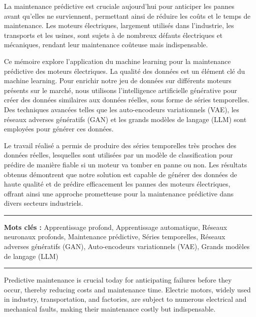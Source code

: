 
La maintenance prédictive est cruciale aujourd'hui pour anticiper les pannes avant qu'elles ne surviennent, 
permettant ainsi de réduire les coûts et le temps de maintenance. Les moteurs électriques, largement utilisés dans l'industrie, 
les transports et les usines, 
sont sujets à de nombreux défauts électriques et mécaniques, rendant leur maintenance coûteuse mais indispensable.

\medskip

Ce mémoire explore l'application du machine learning pour la maintenance prédictive des moteurs électriques. 
La qualité des données est un élément clé du machine learning. Pour enrichir notre jeu de données sur différents moteurs 
présents sur le marché, nous utilisons l'intelligence artificielle générative pour créer des données similaires aux données réelles,
 sous forme de séries temporelles. Des techniques avancées telles que les auto-encodeurs variationnels (VAE), 
 les réseaux adverses génératifs (GAN) et les grands modèles de langage (LLM) sont employées pour générer ces données.

\medskip
Le travail réalisé a permis de produire des séries temporelles très proches des données réelles,
lesquelles sont utilisées par un modèle de classification pour prédire de manière fiable si un moteur va tomber en panne ou non. 
Les résultats obtenus démontrent que notre solution est capable de générer des données de haute qualité et de prédire efficacement 
les pannes des moteurs électriques, offrant ainsi une approche prometteuse pour la maintenance prédictive dans divers secteurs industriels.

\vspace{1cm}


\noindent\rule[2pt]{\textwidth}{0.5pt}

{\textbf{Mots clés :}}
Apprentissage profond, Apprentissage automatique, Réseaux neuronaux profonds, Maintenance prédictive, 
Séries temporelles, Réseaux adverses génératifs (GAN), Auto-encodeurs variationnels (VAE), Grands modèles de langage (LLM)
\\
\noindent\rule[2pt]{\textwidth}{0.5pt}

\clearpage


Predictive maintenance is crucial today for anticipating failures before they occur, 
thereby reducing costs and maintenance time. Electric motors, widely used in industry, 
transportation, and factories, are subject to numerous electrical and mechanical faults, making their
maintenance costly but indispensable.

